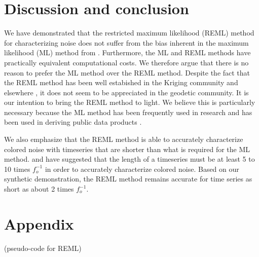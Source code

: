 \documentclass[10pt,a4paper]{article}
\begin{document}
\section{Discussion and conclusion}
We have demonstrated that the restricted maximum likelihood (REML) method for characterizing noise does not suffer from the bias inherent in the maximum likelihood (ML) method from \citet{Langbein1997}. Furthermore, the ML and REML methods have practically equivalent computational costs. We therefore argue that there is no reason to prefer the ML method over the REML method. Despite the fact that the REML method has been well estabished in the Kriging community and elsewhere \citep[e.g.][]{Wahba1985}, it does not seem to be appreciated in the geodetic community.  It is our intention to bring the REML method to light. We believe this is particularly necessary because the ML method has been frequently used in research and has been used in deriving public data products \citep[e.g.][]{Murray2017}. 

We also emphasize that the REML method is able to accurately characterize colored noise with timeseries that are shorter than what is required for the ML method. \citet{Langbein1997} and \citet{Langbein2012} have suggested that the length of a timeseries must be at least 5 to 10 times $f_o^{-1}$ in order to accurately characterize colored noise. Based on our synthetic demonstration, the REML method remains accurate for time series as short as about 2 times $f_o^{-1}$.      

\section{Appendix}
(pseudo-code for REML)


  
\end{document}
